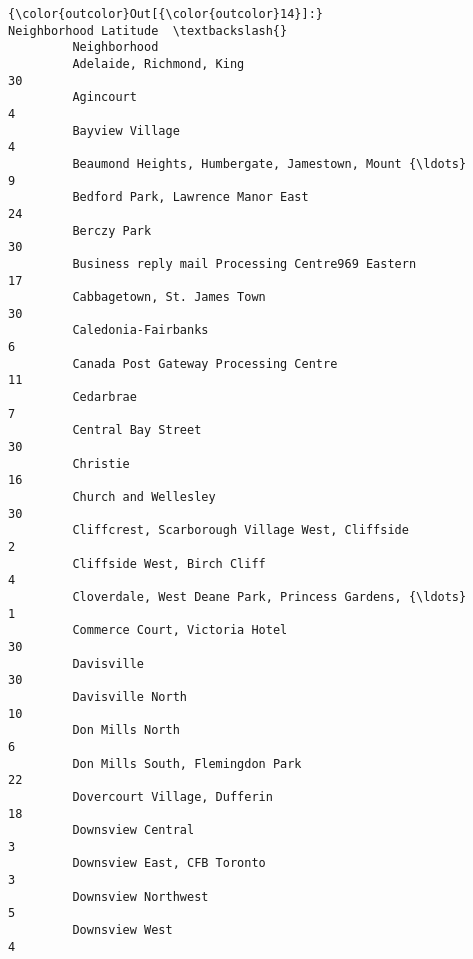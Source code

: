 \documentclass[11pt]{article}
\begin{document}
\begin{Verbatim}[commandchars=\\\{\}]
{\color{outcolor}Out[{\color{outcolor}14}]:}                                                     Neighborhood Latitude  \textbackslash{}
         Neighborhood                                                                
         Adelaide, Richmond, King                                               30   
         Agincourt                                                               4   
         Bayview Village                                                         4   
         Beaumond Heights, Humbergate, Jamestown, Mount {\ldots}                      9   
         Bedford Park, Lawrence Manor East                                      24   
         Berczy Park                                                            30   
         Business reply mail Processing Centre969 Eastern                       17   
         Cabbagetown, St. James Town                                            30   
         Caledonia-Fairbanks                                                     6   
         Canada Post Gateway Processing Centre                                  11   
         Cedarbrae                                                               7   
         Central Bay Street                                                     30   
         Christie                                                               16   
         Church and Wellesley                                                   30   
         Cliffcrest, Scarborough Village West, Cliffside                         2   
         Cliffside West, Birch Cliff                                             4   
         Cloverdale, West Deane Park, Princess Gardens, {\ldots}                      1   
         Commerce Court, Victoria Hotel                                         30   
         Davisville                                                             30   
         Davisville North                                                       10   
         Don Mills North                                                         6   
         Don Mills South, Flemingdon Park                                       22   
         Dovercourt Village, Dufferin                                           18   
         Downsview Central                                                       3   
         Downsview East, CFB Toronto                                             3   
         Downsview Northwest                                                     5   
         Downsview West                                                          4   

\end{Verbatim}
\end{document}
